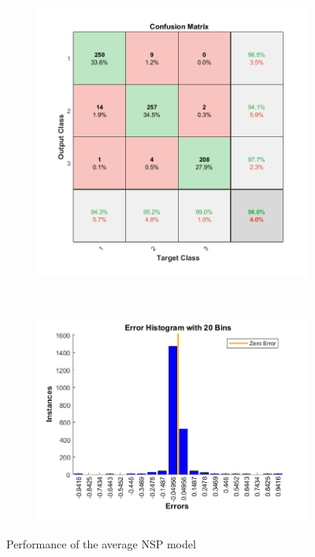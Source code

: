 \documentclass[11pt,a4paper]{article}
\begin{document}
\begin{figure}[htb]
  \centering
  \begin{subfigure}[b]{0.45\textwidth}
    \centering
    \includegraphics[width=\textwidth]{figures/NSP/avg_conf_matrix.png}
  \end{subfigure}
  ~
  \begin{subfigure}[b]{0.45\textwidth}
    \centering
    \includegraphics[width=\textwidth]{figures/NSP/avg_err_hist.png}
  \end{subfigure}
  \caption{Performance of the average NSP model}
  \label{fig:NSP_AVG}
\end{figure}
\end{document}
